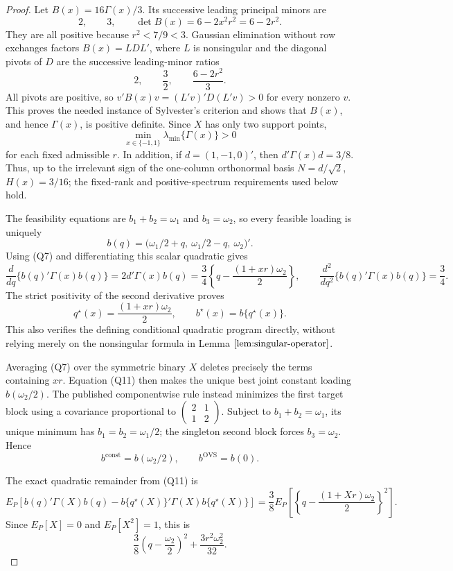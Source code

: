 \documentclass{article}
\begin{document}
\begin{proof}
Let \(B(x)=16\Gamma(x)/3\).  Its successive leading principal minors are
\[
 2,\qquad 3,\qquad \det B(x)=6-2x^2r^2=6-2r^2.
\tag{Q8}
\]
They are all positive because \(r^2<7/9<3\).  Gaussian elimination without row exchanges factors \(B(x)=L D L'\), where \(L\) is nonsingular and the diagonal pivots of \(D\) are the successive leading-minor ratios
\[
 2,\qquad \frac32,\qquad \frac{6-2r^2}{3}.
\]
All pivots are positive, so \(v'B(x)v=(L'v)'D(L'v)>0\) for every nonzero \(v\).  This proves the needed instance of Sylvester's criterion and shows that \(B(x)\), and hence \(\Gamma(x)\), is positive definite.  Since \(X\) has only two support points,
\[
 \min_{x\in\{-1,1\}}\lambda_{\min}\{\Gamma(x)\}>0
\tag{Q9}
\]
for each fixed admissible \(r\).  In addition, if \(d=(1,-1,0)'\), then \(d'\Gamma(x)d=3/8\).  Thus, up to the irrelevant sign of the one-column orthonormal basis \(N=d/\sqrt2\), \(H(x)=3/16\); the fixed-rank and positive-spectrum requirements used below hold.

The feasibility equations are \(b_1+b_2=\omega_1\) and \(b_3=\omega_2\), so every feasible loading is uniquely
\[
 b(q)=\bigl(\omega_1/2+q,\ \omega_1/2-q,\ \omega_2\bigr)'.
\tag{Q10}
\]
Using (Q7) and differentiating this scalar quadratic gives
\[
 \frac{d}{dq}\{b(q)'\Gamma(x)b(q)\}
 =2d'\Gamma(x)b(q)
 =\frac34\left\{q-\frac{(1+xr)\omega_2}{2}\right\},
 \qquad
 \frac{d^2}{dq^2}\{b(q)'\Gamma(x)b(q)\}=\frac34.
\tag{Q11}
\]
The strict positivity of the second derivative proves
\[
 q^\star(x)=\frac{(1+xr)\omega_2}{2},
 \qquad b^\star(x)=b\{q^\star(x)\}.
\tag{Q12}
\]
This also verifies the defining conditional quadratic program directly, without relying merely on the nonsingular formula in Lemma \(\ref{lem:singular-operator}\).

Averaging (Q7) over the symmetric binary \(X\) deletes precisely the terms containing \(xr\).  Equation (Q11) then makes the unique best joint constant loading \(b(\omega_2/2)\).  The published componentwise rule instead minimizes the first target block using a covariance proportional to
\(\left(\begin{smallmatrix}2&1\\1&2\end{smallmatrix}\right)\).  Subject to \(b_1+b_2=\omega_1\), its unique minimum has \(b_1=b_2=\omega_1/2\); the singleton second block forces \(b_3=\omega_2\).  Hence
\[
 b^{\mathrm{const}}=b(\omega_2/2),
 \qquad b^{\mathrm{OVS}}=b(0).
\tag{Q13}
\]

The exact quadratic remainder from (Q11) is
\[
 E_P\!\left[b(q)'\Gamma(X)b(q)
 -b\{q^\star(X)\}'\Gamma(X)b\{q^\star(X)\}\right]
 =\frac38E_P\!\left[\left\{q-\frac{(1+Xr)\omega_2}{2}\right\}^2\right].
\tag{Q14}
\]
Since \(E_P[X]=0\) and \(E_P[X^2]=1\), this is
\[
 \frac38\left(q-\frac{\omega_2}{2}\right)^2
 +\frac{3r^2\omega_2^2}{32}.
\tag{Q15}
\]


\end{proof}
\end{document}
